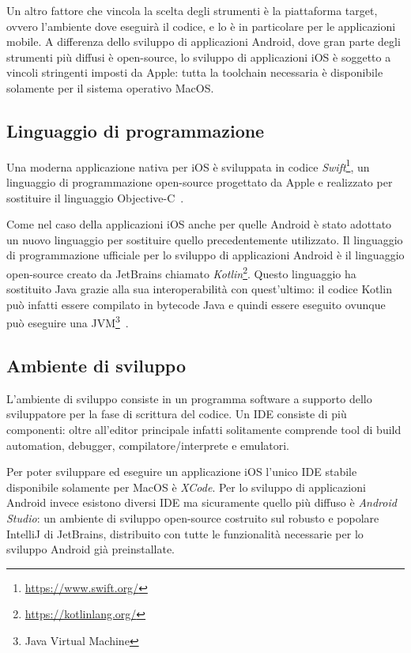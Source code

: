 Un altro fattore che vincola la scelta degli strumenti è la piattaforma target, ovvero l'ambiente dove eseguirà il codice, e lo è in particolare per le applicazioni mobile. A differenza dello sviluppo di applicazioni Android, dove gran parte degli strumenti più diffusi è open-source, lo sviluppo di applicazioni iOS è soggetto a vincoli stringenti imposti da Apple: tutta la toolchain necessaria è disponibile solamente per il sistema operativo MacOS.

\subsection*{Linguaggio di programmazione}
Una moderna applicazione nativa per iOS è sviluppata in codice \textit{Swift}\footnote{\href{https://www.swift.org/}{https://www.swift.org/}}, un linguaggio di programmazione open-source progettato da Apple e realizzato per sostituire il linguaggio Objective-C~\cite{kerr2018beginning}.

Come nel caso della applicazioni iOS anche per quelle Android è stato adottato un nuovo linguaggio per sostituire quello precedentemente utilizzato. Il linguaggio di programmazione ufficiale per lo sviluppo di applicazioni Android è il linguaggio open-source creato da JetBrains chiamato \textit{Kotlin}\footnote{\href{https://kotlinlang.org/}{https://kotlinlang.org/}}. Questo linguaggio ha sostituito Java grazie alla sua interoperabilità con quest'ultimo: il codice Kotlin può infatti essere compilato in bytecode Java e quindi essere eseguito ovunque può eseguire una JVM\footnote{Java Virtual Machine}~\cite{laurence2021programming}.

\subsection*{Ambiente di sviluppo}
L'ambiente di sviluppo consiste in un programma software a supporto dello sviluppatore per la fase di scrittura del codice. Un IDE consiste di più componenti: oltre all'editor principale infatti solitamente comprende tool di build automation, debugger, compilatore/interprete e emulatori.

Per poter sviluppare ed eseguire un applicazione iOS l'unico IDE stabile disponibile solamente per MacOS è \textit{XCode}. Per lo sviluppo di applicazioni Android invece esistono diversi IDE ma sicuramente quello più diffuso è \textit{Android Studio}: un ambiente di sviluppo open-source costruito sul robusto e popolare IntelliJ di JetBrains, distribuito con tutte le funzionalità necessarie per lo sviluppo Android già preinstallate.

